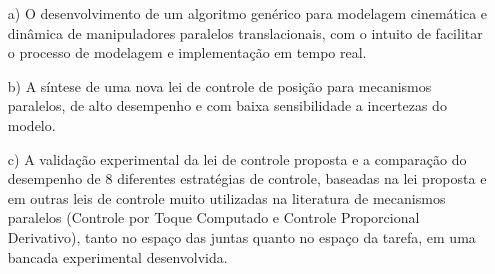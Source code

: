 \documentclass[]{politex}
\begin{document}
\begin{itemize}
\item[a)] O desenvolvimento de um algoritmo genérico para modelagem cinemática e dinâmica de manipuladores paralelos translacionais, com o intuito de facilitar o processo de modelagem e implementação em tempo real.
\item[b)] A síntese de uma nova lei de controle de posição para mecanismos paralelos, de alto desempenho e com baixa sensibilidade a incertezas do modelo.
\item[c)] A validação experimental da lei de controle proposta e a comparação do desempenho de 8 diferentes estratégias de controle, baseadas na lei proposta e em outras leis de controle muito utilizadas na literatura de mecanismos paralelos (Controle por Toque Computado e Controle Proporcional Derivativo), tanto no espaço das juntas quanto no espaço da tarefa, em uma bancada experimental desenvolvida.
\end{itemize}









\end{document}
